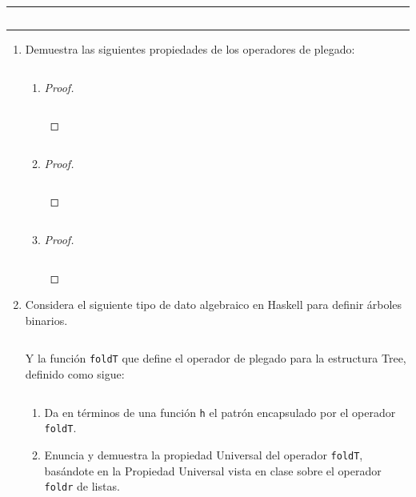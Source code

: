 \documentclass[11pt,letterpaper]{article}
\newcommand{\code}[1]{\textcolor{WildStrawberry}{\texttt{#1}}}
\begin{document}
\inputminted{haskell}{assets/def-foldl.hs}

\noindent
{\color{WildStrawberry} \rule{\linewidth}{0.4mm} }

\inputminted{haskell}{assets/def-reverse.hs}

\noindent
{\color{WildStrawberry} \rule{\linewidth}{0.4mm} }

\begin{enumerate}
\item Demuestra las siguientes propiedades de los operadores de plegado:

\begin{enumerate}[label=\alph*)]
    \item \inputminted{haskell}{assets/1-a.hs}
    \begin{proof}
        \hfill
        \inputminted{haskell}{assets/1-a-proof.hs}
    \end{proof}

    \item \inputminted{haskell}{assets/1-b.hs}
    \begin{proof}
        \hfill
        \inputminted{haskell}{assets/1-b-proof.hs}
    \end{proof}

    \item \inputminted{haskell}{assets/1-c.hs}
    \begin{proof}
        \hfill
        \inputminted{haskell}{assets/1-c-proof.hs}
    \end{proof}
\end{enumerate}

\item Considera el siguiente tipo de dato algebraico en Haskell para definir árboles binarios.

\inputminted{haskell}{assets/2-1.hs}

Y la función \code{foldT} que define el operador de plegado para la estructura Tree, definido como sigue:

\inputminted{haskell}{assets/2-2.hs}

\begin{enumerate}[label=\alph*)]
    \item Da en términos de una función \code{h} el patrón encapsulado por el operador \code{foldT}.
    

    \item Enuncia y demuestra la propiedad Universal del operador \code{foldT}, basándote en la
    Propiedad Universal vista en clase sobre el operador \code{foldr} de listas.


\end{enumerate}
\end{enumerate}
\end{document}
